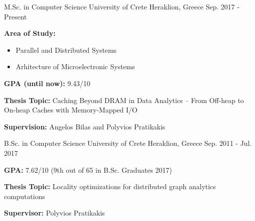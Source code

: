 
\begin{cventries}

  \cventry
    {M.Sc. in Computer Science} %
    {University of Crete} %
    {Heraklion, Greece} %
    {Sep. 2017 - Present} %
    {
      \begin{cvitems} %
      \item{\textbf{Area of Study:}}
          \begin{itemize}
          \item{Parallel and Distributed Systems}
          \item{Arhitecture of Microelectronic Systems}
          \end{itemize}
      \item{\textbf{GPA (until now):} 9.43/10}
      \item{\textbf{Thesis Topic:} 
         Caching Beyond DRAM in Data Analytics -- From Off-heap to
              On-heap Caches with Memory-Mapped I/O}
        \item{\textbf{Supervision:} Angelos Bilas and Polyvios Pratikakis}
      \end{cvitems}
    }

  \cventry
    {B.Sc. in Computer Science} %
    {University of Crete} %
    {Heraklion, Greece} %
    {Sep. 2011 - Jul. 2017} %
    {
      \begin{cvitems} %
      \item{\textbf{GPA:} 7.62/10 (9th out of 65 in B.Sc. Graduates 2017)}
      \item{\textbf{Thesis Topic:} Locality optimizations for
          distributed graph analytics computations}
        \item{\textbf{Supervisor:} Polyvios Pratikakis}
      \end{cvitems}
    }

\end{cventries}
